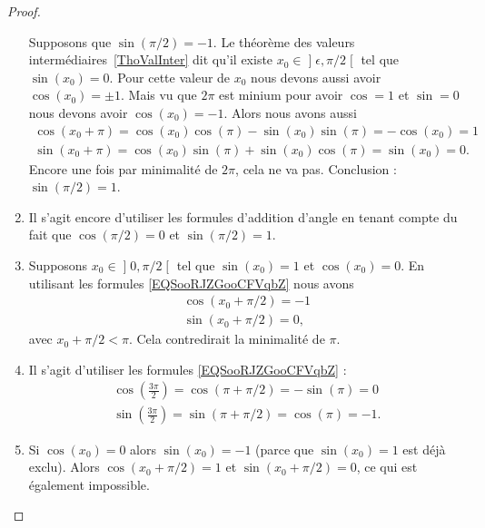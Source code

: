 \begin{proof}
\begin{enumerate}
        Supposons que \( \sin(\pi/2)=-1\). Le théorème des valeurs intermédiaires~\ref{ThoValInter} dit qu'il existe \( x_0\in\mathopen] \epsilon , \pi/2 \mathclose[\) tel que \( \sin(x_0)=0\). Pour cette valeur de \( x_0\) nous devons aussi avoir \( \cos(x_0)=\pm 1\). Mais vu que \( 2\pi\) est minium pour avoir \( \cos=1\) et \( \sin=0\) nous devons avoir \( \cos(x_0)=-1\). Alors nous avons aussi
            \begin{subequations}
                \begin{align}
                    \cos(x_0+\pi)=\cos(x_0)\cos(\pi)-\sin(x_0)\sin(\pi)=-\cos(x_0)=1\\
                    \sin(x_0+\pi)=\cos(x_0)\sin(\pi)+\sin(x_0)\cos(\pi)=\sin(x_0)=0.
                \end{align}
            \end{subequations}
            Encore une fois par minimalité de \( 2\pi\), cela ne va pas. Conclusion : \( \sin(\pi/2)=1\).
        \item
            Il s'agit encore d'utiliser les formules d'addition d'angle en tenant compte du fait que \( \cos(\pi/2)=0\) et \( \sin(\pi/2)=1\).
        \item
        Supposons \( x_0\in\mathopen] 0 , \pi/2 \mathclose[\) tel que \( \sin(x_0)=1\) et \( \cos(x_0)=0\). En utilisant les formules \eqref{EQSooRJZGooCFVqbZ} nous avons
            \begin{subequations}
                \begin{align}
                    \cos(x_0+\pi/2)=-1\\
                    \sin(x_0+\pi/2)=0,
                \end{align}
            \end{subequations}
            avec \( x_0+\pi/2<\pi\). Cela contredirait la minimalité de \( \pi\).
        \item
            Il s'agit d'utiliser les formules \eqref{EQSooRJZGooCFVqbZ} :
            \begin{subequations}
                \begin{align}
                    \cos(\frac{ 3\pi }{ 2 })=\cos(\pi+\pi/2)=-\sin(\pi)=0\\
                    \sin(\frac{ 3\pi }{ 2 })=\sin(\pi+\pi/2)=\cos(\pi)=-1.
                \end{align}
            \end{subequations}
        \item
            Si \( \cos(x_0)=0\) alors \( \sin(x_0)=-1\) (parce que \( \sin(x_0)=1\) est déjà exclu). Alors \( \cos(x_0+\pi/2)=1\) et \( \sin(x_0+\pi/2)=0\), ce qui est également impossible.
    \end{enumerate}
\end{proof}

